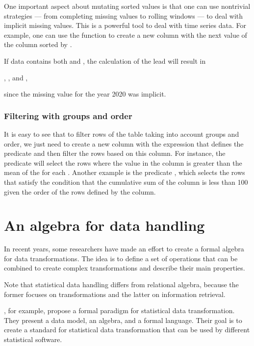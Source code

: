 One important aspect about mutating sorted values is that one can use nontrivial
strategies --- from completing missing values to rolling windows --- to deal with implicit
missing values.  This is a powerful tool to deal with time series data. For example, one
can use the  function to create a new column with the next value of the
 column sorted by .

If data contains both  and
, the calculation of the lead will result in
\begin{center}
  , , and ,
\end{center}
since the missing value for the year 2020 was implicit.

\subsubsection{Filtering with groups and order}

It is easy to see that to filter rows of the table taking into account groups and order,
we just need to create a new column with the expression that defines the predicate and
then filter the rows based on this column.  For instance, the predicate  will select the rows where the value in the  column is greater
than the mean of the  for each . Another example is the predicate
, which selects the rows that satisfy the condition
that the cumulative sum of the  column is less than 100 given the order of the
rows defined by the  column.

\section{An algebra for data handling}

In recent years, some researchers have made an effort to create a formal algebra for data
transformations.  The idea is to define a set of operations that can be combined to create
complex transformations and describe their main properties.

Note that statistical data handling differs from relational algebra, because the former focuses
on transformations and the latter on information retrieval.

\textcite{Song2021}, for example, propose a formal paradigm for statistical data
transformation.  They present a data model, an algebra, and a formal language.  Their goal
is to create a standard for statistical data transformation that can be used by different
statistical software.


